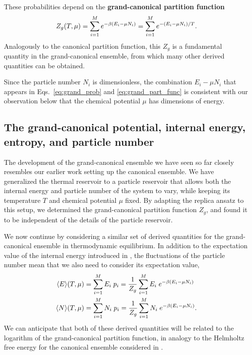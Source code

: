 \begin{shaded}
  These probabilities depend on the \textbf{grand-canonical partition function}
  \begin{equation}
    \label{eq:grand_part_func}
    Z_g(T, \mu) = \sum_{i = 1}^M e^{-\beta (E_i - \mu N_i)} = \sum_{i = 1}^M e^{-(E_i - \mu N_i) / T}.
  \end{equation}
  Analogously to the canonical partition function, this $Z_g$ is a fundamental quantity in the grand-canonical ensemble, from which many other derived quantities can be obtained.
\end{shaded}

Since the particle number $N_i$ is dimensionless, the combination $E_i - \mu N_i$ that appears in Eqs.~\ref{eq:grand_prob} and \ref{eq:grand_part_func} is consistent with our observation below  that the chemical potential $\mu$ has dimensions of energy.



\subsection{The grand-canonical potential, internal energy, entropy, and particle number}
The development of the grand-canonical ensemble we have seen so far closely resembles our earlier work setting up the canonical ensemble.
We have generalized the thermal reservoir to a particle reservoir that allows both the internal energy and particle number of the system \Om to vary, while keeping its temperature $T$ and chemical potential $\mu$ fixed.
By adapting the replica ansatz to this setup, we determined the grand-canonical partition function $Z_g$, and found it to be independent of the details of the particle reservoir.

We now continue by considering a similar set of derived quantities for the grand-canonical ensemble in thermodynamic equilibrium.
In addition to the expectation value of the internal energy introduced in , the fluctuations of the particle number mean that we also need to consider its expectation value,
\begin{align*}
  \left\langle E \right\rangle\!(T, \mu) & = \sum_{i = 1}^M E_i \; p_i = \frac{1}{Z_g} \sum_{i = 1}^M E_i \; e^{-\beta (E_i - \mu N_i)} \\
  \left\langle N \right\rangle\!(T, \mu) & = \sum_{i = 1}^M N_i \; p_i = \frac{1}{Z_g} \sum_{i = 1}^M N_i \; e^{-\beta (E_i - \mu N_i)}.
\end{align*}
We can anticipate that both of these derived quantities will be related to the logarithm of the grand-canonical partition function, in analogy to the Helmholtz free energy for the canonical ensemble considered in .

